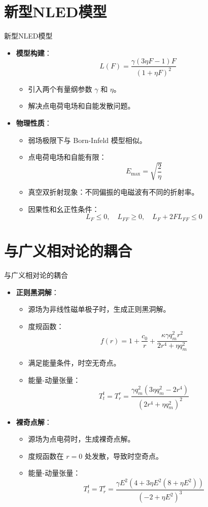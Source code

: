 \documentclass{beamer}
\begin{document}
\section{新型NLED模型}
\begin{frame}{新型NLED模型}
\begin{itemize}
    \item \textbf{模型构建}：
    \[
    L(F) = \frac{\gamma(3\eta F-1)F}{(1+\eta F)^2}
    \]
    \begin{itemize}
        \item 引入两个有量纲参数 \(\gamma\) 和 \(\eta\)。
        \item 解决点电荷电场和自能发散问题。
    \end{itemize}
    \item \textbf{物理性质}：
    \begin{itemize}
        \item 弱场极限下与 Born-Infeld 模型相似。
        \item 点电荷电场和自能有限：
        \[
        E_{\text{max}} = \sqrt{\frac{2}{\eta}}
        \]
        \item 真空双折射现象：不同偏振的电磁波有不同的折射率。
        \item 因果性和幺正性条件：
        \[
        L_F \leq 0, \quad L_{FF} \geq 0, \quad L_F + 2FL_{FF} \leq 0
        \]
    \end{itemize}
\end{itemize}
\end{frame}

\section{与广义相对论的耦合}
\begin{frame}{与广义相对论的耦合}
\begin{itemize}
    \item \textbf{正则黑洞解}：
    \begin{itemize}
        \item 源场为非线性磁单极子时，生成正则黑洞解。
        \item 度规函数：
        \[
        f(r) = 1 + \frac{c_0}{r} + \frac{\kappa \gamma q_m^2 r^2}{2r^4 + \eta q_m^2}
        \]
        \item 满足能量条件，时空无奇点。
        \item 能量-动量张量：
        \[
        T_t^t = T_r^r = \frac{\gamma q_m^2 (3\eta q_m^2 - 2r^4)}{(2r^4 + \eta q_m^2)^2}
        \]
    \end{itemize}
    \item \textbf{裸奇点解}：
    \begin{itemize}
        \item 源场为点电荷时，生成裸奇点解。
        \item 度规函数在 \(r=0\) 处发散，导致时空奇点。
        \item 能量-动量张量：
        \[
        T_t^t = T_r^r = \frac{\gamma E^2 (4 + 3\eta E^2 (8 + \eta E^2))}{(-2 + \eta E^2)^3}
        \]
    \end{itemize}
\end{itemize}
\end{frame}
\end{document}
